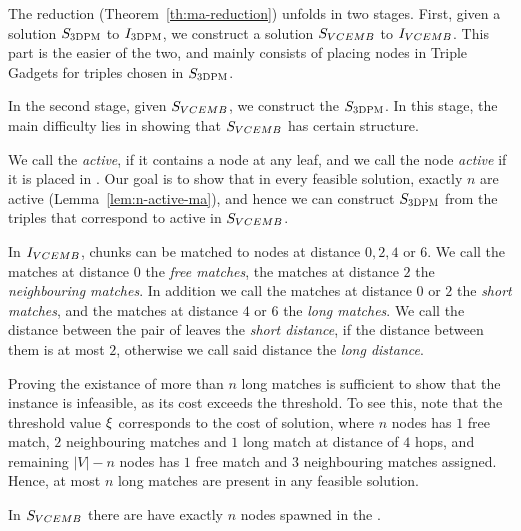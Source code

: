 The reduction (Theorem~\ref{th:ma-reduction}) unfolds in two stages.
First, given a solution $S_{\textsc{3DPM}}$ to $I_{\textsc{3DPM}}$, we construct a solution $S_{VCEMB}$ to $I_{VCEMB}$.
This part is the easier of the two, and mainly consists of placing nodes in Triple Gadgets for triples chosen in $S_{\textsc{3DPM}}$.

In the second stage, given $S_{VCEMB}$, we construct the $S_{\textsc{3DPM}}$.
In this stage, the main difficulty lies in showing that $S_{VCEMB}$ has certain structure.

We call the {\TripleGadget} \textit{active}, if it contains a node at any leaf, and we call the node \textit{active} if it is placed in {\TripleGadget}.
Our goal is to show that in every feasible solution, exactly $n$ \TripleGadgets{} are active (Lemma~\ref{lem:n-active-ma}), and hence we can construct $S_{\textsc{3DPM}}$ from the triples that correspond to active \TripleGadgets{} in $S_{VCEMB}$.

In $I_{VCEMB}$, chunks can be matched to nodes at distance $0, 2, 4$ or $6$.
  We call the matches at distance $0$ the \emph{free matches}, the matches at distance $2$ the \emph{neighbouring matches}.
  In addition we call the matches at distance $0$ or $2$ the \emph{short matches}, and the matches at distance $4$ or $6$ the \emph{long matches}.
  We call the distance between the pair of leaves the \emph{short distance}, if the distance between them is at most $2$, otherwise we call said distance the \emph{long distance}.

Proving the existance of more than $n$ long matches is sufficient to show that the instance is infeasible, as its cost exceeds the threshold.
To see this, note that the threshold value $\xi$ corresponds to the cost of solution, where $n$ nodes has $1$ free match, $2$ neighbouring matches and $1$ long match at distance of $4$ hops, and remaining $|V|-n$ nodes has $1$ free match and $3$ neighbouring matches assigned.
Hence, at most $n$ long matches are present in any feasible solution.


\begin{lemma}
  In $S_{VCEMB}$ there are have exactly $n$ nodes spawned in the \MatchSubtree.
  \label{lem:n-matchsubtree-ma}
\end{lemma}

